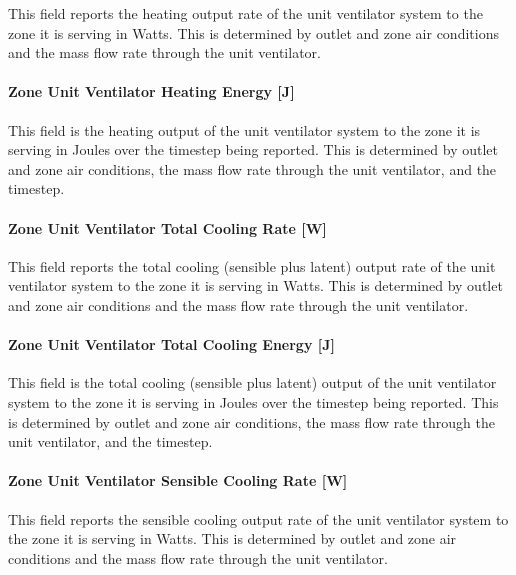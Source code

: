 This field reports the heating output rate of the unit ventilator system to the zone it is serving in Watts. This is determined by outlet and zone air conditions and the mass flow rate through the unit ventilator.

\paragraph{Zone Unit Ventilator Heating Energy {[}J{]}}\label{zone-unit-ventilator-heating-energy-j}

This field is the heating output of the unit ventilator system to the zone it is serving in Joules over the timestep being reported. This is determined by outlet and zone air conditions, the mass flow rate through the unit ventilator, and the timestep.

\paragraph{Zone Unit Ventilator Total Cooling Rate {[}W{]}}\label{zone-unit-ventilator-total-cooling-rate-w}

This field reports the total cooling (sensible plus latent) output rate of the unit ventilator system to the zone it is serving in Watts. This is determined by outlet and zone air conditions and the mass flow rate through the unit ventilator.

\paragraph{Zone Unit Ventilator Total Cooling Energy {[}J{]}}\label{zone-unit-ventilator-total-cooling-energy-j}

This field is the total cooling (sensible plus latent) output of the unit ventilator system to the zone it is serving in Joules over the timestep being reported. This is determined by outlet and zone air conditions, the mass flow rate through the unit ventilator, and the timestep.

\paragraph{Zone Unit Ventilator Sensible Cooling Rate {[}W{]}}\label{zone-unit-ventilator-sensible-cooling-rate-w}

This field reports the sensible cooling output rate of the unit ventilator system to the zone it is serving in Watts. This is determined by outlet and zone air conditions and the mass flow rate through the unit ventilator.

